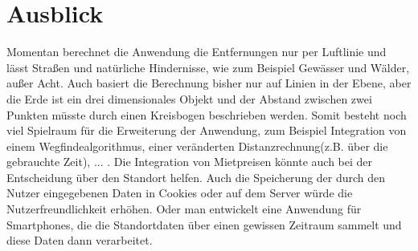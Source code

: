 \documentclass[a4paper, twoside, 12pt]{scrreprt}
\begin{document}
\section{Ausblick}
Momentan berechnet die Anwendung die Entfernungen nur per Luftlinie und lässt Straßen und natürliche Hindernisse, wie zum Beispiel Gewässer und Wälder, außer Acht.
Auch basiert die Berechnung bisher nur auf Linien in der Ebene, aber die Erde ist ein drei dimensionales Objekt und der Abstand zwischen zwei Punkten müsste durch einen Kreisbogen beschrieben werden.
Somit besteht noch viel Spielraum für die Erweiterung der Anwendung, zum Beispiel Integration von einem Wegfindealgorithmus, einer veränderten Distanzrechnung(z.B. über die gebrauchte Zeit), ... .
Die Integration von Mietpreisen könnte auch bei der Entscheidung über den Standort helfen.
Auch die Speicherung der durch den Nutzer eingegebenen Daten in Cookies oder auf dem Server würde die Nutzerfreundlichkeit erhöhen. Oder man entwickelt eine Anwendung für Smartphones, die die Standortdaten über einen gewissen Zeitraum sammelt und diese Daten dann verarbeitet.


\end{document}
